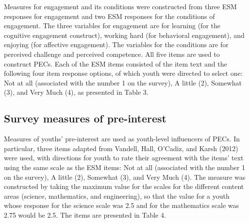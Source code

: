 \documentclass[]{msu-thesis}
\theoremstyle{definition}
\theoremstyle{definition}
\theoremstyle{definition}
\theoremstyle{remark}
\begin{document}
Measures for engagement and its conditions were constructed from three
ESM responses for engagement and two ESM responses for the conditions of
engagement. The three variables for engagement are for learning (for the
cognitive engagement construct), working hard (for behavioral
engagement), and enjoying (for affective engagement). The variables for
the conditions are for perceived challenge and perceived competence. All
five items are used to construct PECs. Each of the ESM items consisted
of the item text and the following four item response options, of which
youth were directed to select one: Not at all (associated with the
number 1 on the survey), A little (2), Somewhat (3), and Very Much (4),
as presented in Table 3.

\begin{table}

\caption{\label{tab:unnamed-chunk-4}ESM measures for profiles of engagement and its conditions (PECs)}
\centering
{}
\end{table}

\subsection{Survey measures of
pre-interest}\label{survey-measures-of-pre-interest}

Measures of youths' pre-interest are used as youth-level influencers of
PECs. In particular, three items adapted from Vandell, Hall, O'Cadiz,
and Karsh (2012) were used, with directions for youth to rate their
agreement with the items' text using the same scale as the ESM items:
Not at all (associated with the number 1 on the survey), A little (2),
Somewhat (3), and Very Much (4). The measure was constructed by taking
the maximum value for the scales for the different content areas
(science, mathematics, and engineering), so that the value for a youth
whose response for the science scale was 2.5 and for the mathematics
scale was 2.75 would be 2.5. The items are presented in Table 4.
\end{document}
